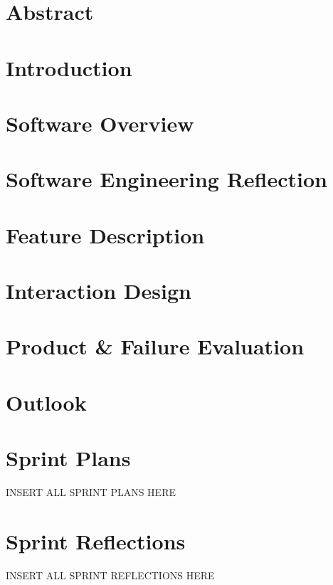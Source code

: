 \documentclass[a4paper]{article}
\title{}
\author[1]{Louis Gosschalk}
\author[2]{Boudewijn van Groos}
\author[3]{Jens Langerak}
\author[4]{Chris Langhout}
\author[5]{Paul van Wijk}
\affil[1]{lgosschalk \\
4214528}
\affil[2]{bvangroos \\
4229843}
\affil[3]{jlangerak \\
4317327}
\affil[4]{clanghout \\
4281705}
\affil[5]{pvanwijk \\
4285034}
\affil[ ]{Health Informatics Group C}
\date{\today}
\begin{document}
\maketitle

\section*{Abstract}

\newpage

\tableofcontents

\newpage

\section{Introduction}

\section{Software Overview}

\section{Software Engineering Reflection}

\section{Feature Description}

\section{Interaction Design}

\section{Product \& Failure Evaluation}

\section{Outlook}

\newpage
\appendix
\section{Sprint Plans} \label{App:AppendixA}

INSERT ALL SPRINT PLANS HERE

\newpage
\section{Sprint Reflections} \label{App:AppendixB}

INSERT ALL SPRINT REFLECTIONS HERE

\newpage


\end{document}

